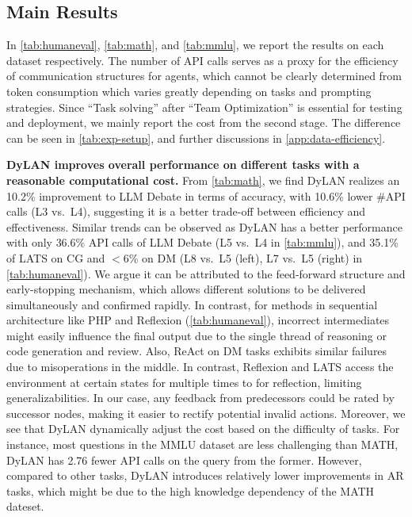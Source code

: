 \documentclass{article} %
\begin{document}
\subsection{Main Results}

In \cref{tab:humaneval}, \cref{tab:math}, and \cref{tab:mmlu}, we report the results on each dataset respectively. The number of API calls serves as a proxy for the efficiency of communication structures for agents, which cannot be clearly determined from token consumption which varies greatly depending on tasks and prompting strategies. Since ``Task solving'' after ``Team Optimization'' is essential for testing and deployment, we mainly report the cost from the second stage. The difference can be seen in \cref{tab:exp-setup}, and further discussions in \cref{app:data-efficiency}. 

\textbf{DyLAN improves overall performance on different tasks with a reasonable computational cost.}
From \cref{tab:math}, we find DyLAN realizes an \textcolor{mydarkgreen}{10.2\%} improvement to LLM Debate in terms of accuracy, with \textcolor{mydarkgreen}{10.6\%} lower \#API calls (L3 vs.~L4), suggesting it is a better trade-off between efficiency and effectiveness. Similar trends can be observed as DyLAN has a better performance with only \textcolor{mydarkgreen}{36.6\%} API calls of LLM Debate (L5 vs.~L4 in \cref{tab:mmlu}), and \textcolor{mydarkgreen}{35.1\%} of LATS on CG and \textcolor{mydarkgreen}{$<$6\%} on DM (L8 vs.~L5 (left), L7 vs.~L5 (right) in \cref{tab:humaneval}). We argue it can be attributed to the feed-forward structure and early-stopping mechanism, which allows different solutions to be delivered simultaneously and confirmed rapidly. 
In contrast, for methods in sequential architecture like PHP and Reflexion (\cref{tab:humaneval}), incorrect intermediates might easily influence the final output due to the single thread of reasoning or code generation and review. Also, ReAct on DM tasks exhibits similar failures due to misoperations in the middle. In contrast, Reflexion and LATS access the environment at certain states for multiple times to for reflection, limiting generalizabilities. 
In our case, any feedback from predecessors could be rated by successor nodes, making it easier to rectify potential invalid actions. 
Moreover, we see that DyLAN dynamically adjust the cost based on the difficulty of tasks. For instance, most questions in the MMLU dataset are less challenging than MATH, DyLAN has \textcolor{mydarkgreen}{2.76} fewer API calls on the query from the former. However, compared to other tasks, DyLAN introduces relatively lower improvements in AR tasks, which might be due to the high knowledge dependency of the MATH dateset.
\end{document}
